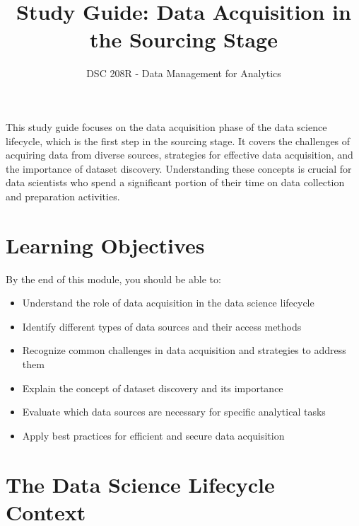 \documentclass[12pt]{article}
\title{Study Guide: Data Acquisition in the Sourcing Stage}
\author{DSC 208R - Data Management for Analytics}
\date{}
\begin{document}
\maketitle

\begin{tcolorbox}[colback=blue!5!white,colframe=blue!75!black,title=Overview]
This study guide focuses on the data acquisition phase of the data science lifecycle, which is the first step in the sourcing stage. It covers the challenges of acquiring data from diverse sources, strategies for effective data acquisition, and the importance of dataset discovery. Understanding these concepts is crucial for data scientists who spend a significant portion of their time on data collection and preparation activities.
\end{tcolorbox}

\section{Learning Objectives}

By the end of this module, you should be able to:

\begin{itemize}
    \item Understand the role of data acquisition in the data science lifecycle
    \item Identify different types of data sources and their access methods
    \item Recognize common challenges in data acquisition and strategies to address them
    \item Explain the concept of dataset discovery and its importance
    \item Evaluate which data sources are necessary for specific analytical tasks
    \item Apply best practices for efficient and secure data acquisition
\end{itemize}

\section{The Data Science Lifecycle Context}
\end{document}
